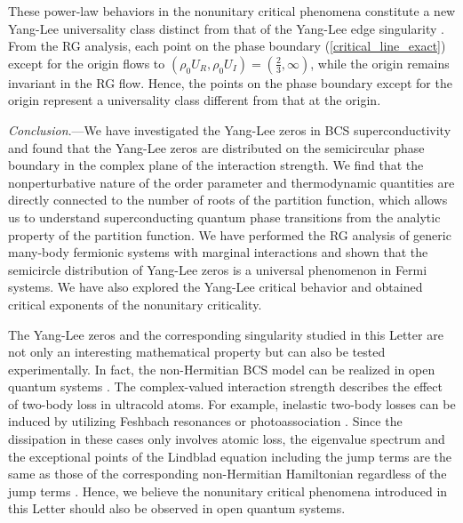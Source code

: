 \documentclass[aps,prl,twocolumn,superscriptaddress]{revtex4-1}
\begin{document}
\begin{bibunit}[apsrev4-2]
These power-law behaviors in the nonunitary
critical phenomena constitute a new Yang-Lee universality class distinct from that of the Yang-Lee edge singularity \cite{Fisher:1978vn}.
From the RG analysis, each point on the phase
boundary (\ref{critical_line_exact}) except for the origin flows
to $(\rho_0U_R,\rho_0U_I)=(\frac{2}{3},\infty)$, while the origin remains invariant in
the RG flow. Hence, the points on the phase boundary except for the
origin represent a universality class different from that at the
origin.

\emph{Conclusion}.---We have investigated the Yang-Lee
zeros in BCS superconductivity and found that the Yang-Lee zeros are distributed
on the semicircular phase boundary in the complex plane of the interaction
strength. We find that the nonperturbative nature of the order parameter and thermodynamic quantities are directly connected to the number of roots of the partition function, which allows us to understand superconducting quantum phase transitions from the analytic property of the partition function. We have performed the RG analysis
of generic many-body fermionic systems with marginal interactions and shown that the semicircle distribution of Yang-Lee zeros is a universal phenomenon in Fermi systems. %
We have also explored the Yang-Lee critical behavior and obtained critical exponents of the nonunitary criticality.

The Yang-Lee zeros and the corresponding singularity studied in this
Letter are not only an interesting mathematical property but can also be tested experimentally. In fact, the non-Hermitian BCS model can be realized in
open quantum systems \cite{Yamamoto2019,PhysRevA.103.013724}. The
complex-valued interaction strength describes the effect of two-body
loss in ultracold atoms. For example, inelastic two-body losses can
be induced by utilizing Feshbach resonances \cite{PhysRevLett.115.265301,PhysRevLett.115.265302,Zhang2015}
or photoassociation \cite{doi:10.1126/sciadv.1701513,Honda2023}.
Since the dissipation in these cases only involves atomic loss, the eigenvalue spectrum and the exceptional points of the Lindblad equation including the jump terms are the same as those of the corresponding non-Hermitian Hamiltonian regardless of the jump terms \cite{PhysRevLett.126.110404}. Hence, we believe the nonunitary critical phenomena introduced in this Letter should also be observed in open quantum systems. %



\end{bibunit}
\end{document}
